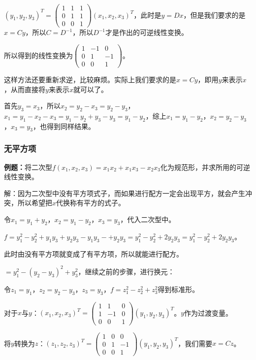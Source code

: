 \documentclass[UTF8, 12pt]{ctexart}
\begin{document}
$(y_1,y_2,y_3)^T=\left(\begin{array}{ccc}
    1 & 1 & 1 \\
    0 & 1 & 1 \\
    0 & 0 & 1
\end{array}\right)(x_1,x_2,x_3)^T$，此时是$y=Dx$，但是我们要求的是$x=Cy$，所以$C=D^{-1}$，所以$D^{-1}$才是作出的可逆线性变换。

所以得到的线性变换为$\left(\begin{array}{ccc}
    1 & -1 & 0 \\
    0 & 1 & -1 \\
    0 & 0 & 1
\end{array}\right)$。

这样方法还要重新求逆，比较麻烦。实际上我们要求的是$x=Cy$，即用$y$来表示$x$，从而直接将$y$来表示$x$就可以了。

首先$y_3=x_3$，所以$x_2=y_2-x_3=y_2-y_3$，$x_1=y_1-x_2-x_3=y_1-y_2+y_3-y_3=y_1-y_2$，综上$x_1=y_1-y_2$，$x_2=y_2-y_3$，$x_3=y_3$，也得到同样结果。

\subsubsection{无平方项}

\textbf{例题：}将二次型$f(x_1,x_2,x_3)=x_1x_2+x_1x_3-x_2x_3$化为规范形，并求所用的可逆线性变换。

解：因为二次型中没有平方项式子，而如果进行配方一定会出现平方，就会产生冲突，所以希望把$x$代换称有平方的式子。

令$x_1=y_1+y_2$，$x_2=y_1-y_2$，$x_3=y_3$，代入二次型中。

$f=y_1^2-y_2^2+y_1y_3+y_2y_3-y_1y_3-+y_2y_3=y_1^2-y_2^2+2y_2y_3=y_1^2-y_2^2+2y_2y_3$。

此时由没有平方项就变成了有平方项，所以就能进行配方。

$=y_1^2-(y_2-y_3)^2+y_3^2$，继续之前的步骤，进行换元：

令$z_1=y_1$，$z_2=y_2-y_3$，$z_3=y_3$，$f=z_1^2-z_2^2+z_3^2$得到标准形。

对于$x$与$y$：$(x_1,x_2,x_3)^T=\left(\begin{array}{ccc}
    1 & 1 & 0 \\
    1 & -1 & 0 \\
    0 & 0 & 1
\end{array}\right)(y_1,y_2,y_3)^T$。$y$作为过渡变量。

将$y$转换为$z$：$(z_1,z_2,z_3)^T=\left(\begin{array}{ccc}
    1 & 0 & 0 \\
    0 & 1 & -1 \\
    0 & 0 & 1
\end{array}\right)(y_1,y_2,y_3)^T$，我们需要$x=Cz$。
\end{document}
